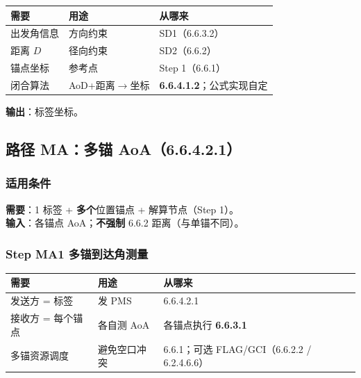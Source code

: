 \documentclass[11pt,a4paper]{ctexart}
\begin{document}
\begin{table}[h]
\centering
\small
\begin{tabular}{L{3.4cm}L{4.8cm}L{4.8cm}}
\toprule
\textbf{需要} & \textbf{用途} & \textbf{从哪来} \\
\midrule
出发角信息 & 方向约束 & SD1（6.6.3.2） \\
距离 $D$ & 径向约束 & SD2（6.6.2） \\
锚点坐标 & 参考点 & Step 1（6.6.1） \\
闭合算法 & AoD+距离$\rightarrow$坐标 & \textbf{6.6.4.1.2}；公式实现自定 \\
\bottomrule
\end{tabular}
\end{table}

\textbf{输出}：标签坐标。

\subsection{路径 MA：多锚 AoA（6.6.4.2.1）}
\label{sec:ma}

\subsubsection{适用条件}

\textbf{需要}：1 标签 + \textbf{多个}位置锚点 + 解算节点（Step 1）。\\
\textbf{输入}：各锚点 AoA；\textbf{不强制} 6.6.2 距离（与单锚不同）。

\subsubsection{Step MA1 多锚到达角测量}

\begin{table}[h]
\centering
\small
\begin{tabular}{L{3.4cm}L{4.8cm}L{4.8cm}}
\toprule
\textbf{需要} & \textbf{用途} & \textbf{从哪来} \\
\midrule
发送方 = 标签 & 发 PMS & 6.6.4.2.1 \\
接收方 = 每个锚点 & 各自测 AoA & 各锚点执行 \textbf{6.6.3.1} \\
多锚资源调度 & 避免空口冲突 & 6.6.1；可选 FLAG/GCI（6.6.2.2 / 6.2.4.6.6） \\
\bottomrule
\end{tabular}
\end{table}
\end{document}
